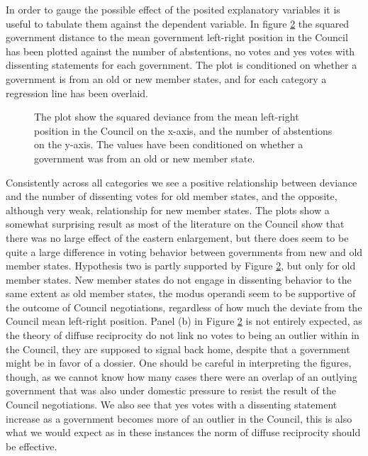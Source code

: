 \begin{figure}[htp]
\centering
\scalebox{.6}{}
\caption{}
\label{fig:depvar}
\end{figure}

In order to gauge the possible effect of the posited explanatory variables it is useful to tabulate them against the dependent variable. In figure \ref{fig:scatter} the squared government distance to the mean government left-right position in the Council has been plotted against the number of abstentions, no votes and yes votes with dissenting statements for each government. The plot is conditioned on whether a government is from an old or new member states, and for each category a regression line has been overlaid. 

\begin{figure}[htp]
\centering
\scalebox{.6}{\subfloat[][]{}}\quad
\scalebox{.6}{\subfloat[][]{}}\quad
\scalebox{.6}{\subfloat[][]{}}\quad
\caption{The plot show the squared deviance from the mean left-right position in the Council on the x-axis, and the number of abstentions on the y-axis. The values have been conditioned on whether a government was from an old or new member state.}
\label{fig:scatter}
\end{figure}

Consistently across all categories we see a positive relationship between deviance and the number of dissenting votes for old member states, and the opposite, although very weak, relationship for new member states. The plots show a somewhat surprising result as most of the literature on the Council show that there was no large effect of the eastern enlargement, but there does seem to be quite a large difference in voting behavior between governments from new and old member states. Hypothesis two is partly supported by Figure \ref{fig:scatter}, but only for old member states. New member states do not engage in dissenting behavior to the same extent as old member states, the modus operandi seem to be supportive of the outcome of Council negotiations, regardless of how much the deviate from the Council mean left-right position. Panel (b) in Figure \ref{fig:scatter} is not entirely expected, as the theory of diffuse reciprocity do not link no votes to being an outlier within in the Council, they are supposed to signal back home, despite that a government might be in favor of a dossier. One should be careful in interpreting the figures, though, as we cannot know how many cases there were an overlap of an outlying government that was also under domestic pressure to resist the result of the Council negotiations. We also see that yes votes with a dissenting statement increase as a government becomes more of an outlier in the Council, this is also what we would expect as in these instances the norm of diffuse reciprocity should be effective.  

